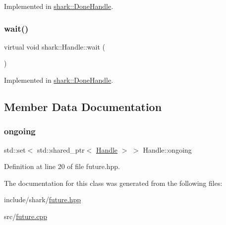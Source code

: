 Implemented in \hyperlink{classshark_1_1_done_handle_aa2207dc4b61f0bffcbfb56aa9f9b0b46}{shark\+::\+Done\+Handle}.

\hypertarget{classshark_1_1_handle_a36117a898368730a1619a1a771cca424}{}\label{classshark_1_1_handle_a36117a898368730a1619a1a771cca424} 
\subsubsection{\texorpdfstring{wait()}{wait()}}
{\footnotesize\ttfamily virtual void shark\+::\+Handle\+::wait (\begin{DoxyParamCaption}{ }\end{DoxyParamCaption})\hspace{0.3cm}{\ttfamily [pure virtual]}}



Implemented in \hyperlink{classshark_1_1_done_handle_a99b4b58b01738073650b9c452e35b7e8}{shark\+::\+Done\+Handle}.



\subsection{Member Data Documentation}
\hypertarget{classshark_1_1_handle_a0ade8d8ad19d5620c10381a7e26db838}{}\label{classshark_1_1_handle_a0ade8d8ad19d5620c10381a7e26db838} 
\subsubsection{\texorpdfstring{ongoing}{ongoing}}
{\footnotesize\ttfamily std\+::set$<$ std\+::shared\+\_\+ptr$<$ \hyperlink{classshark_1_1_handle}{Handle} $>$ $>$ Handle\+::ongoing\hspace{0.3cm}{\ttfamily [static]}}



Definition at line 20 of file future.\+hpp.



The documentation for this class was generated from the following files\+:\begin{DoxyCompactItemize}
\item 
include/shark/\hyperlink{future_8hpp}{future.\+hpp}\item 
src/\hyperlink{future_8cpp}{future.\+cpp}\end{DoxyCompactItemize}
